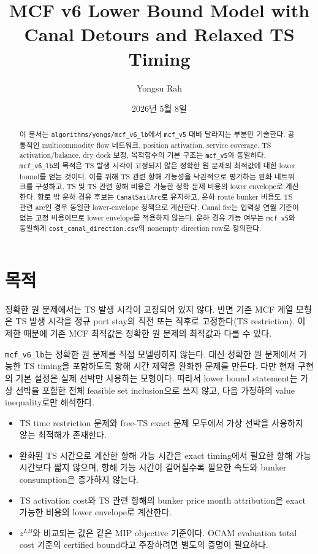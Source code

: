 \documentclass[11pt]{article}
\title{MCF v6 Lower Bound Model with Canal Detours and Relaxed TS Timing}
\author{Yongsu Rah}
\date{2026년 5월 8일}
\begin{document}
\maketitle

\begin{abstract}
이 문서는 \texttt{algorithms/yongs/mcf\_v6\_lb}에서 \texttt{mcf\_v5} 대비
달라지는 부분만 기술한다. 공통적인 multicommodity flow 네트워크, position
activation, service coverage, TS activation/balance, dry dock 보정, 목적함수의
기본 구조는 \texttt{mcf\_v5}와 동일하다. \texttt{mcf\_v6\_lb}의 목적은 TS 발생
시각이 고정되지 않은 정확한 원 문제의 최적값에 대한 lower bound를 얻는 것이다.
이를 위해 TS 관련 항해 가능성을 낙관적으로 평가하는 완화 네트워크를 구성하고,
TS 및 TS 관련 항해 비용은 가능한 정확 문제 비용의 lower envelope로 계산한다.
항로 밖 운하 경유 후보는 \texttt{CanalSailArc}로 유지하고, 운하 route bunker 비용도
TS 관련 arc인 경우 동일한 lower-envelope 정책으로 계산한다. Canal fee는 입력상
연월 기준이 없는 고정 비용이므로 lower envelope를 적용하지 않는다.
운하 경유 가능 여부는 \texttt{mcf\_v5}와 동일하게
\texttt{cost\_canal\_direction.csv}의 nonempty direction row로 정의한다.
\end{abstract}

\section{목적}

정확한 원 문제에서는 TS 발생 시각이 고정되어 있지 않다. 반면 기존 MCF 계열 모형은
TS 발생 시각을 정규 port stay의 직전 또는 직후로 고정한다(TS restriction). 이 제한 때문에
기존 MCF 최적값은 정확한 원 문제의 최적값과 다를 수 있다.

\texttt{mcf\_v6\_lb}는 정확한 원 문제를 직접 모델링하지 않는다. 대신 정확한 원
문제에서 가능한 TS timing을 포함하도록 항해 시간 제약을 완화한 문제를 만든다.
다만 현재 구현의 기본 설정은 실제 선박만 사용하는 모형이다. 따라서 lower bound
statement는 가상 선박을 포함한 전체 feasible set inclusion으로 쓰지 않고, 다음
가정하의 value inequality로만 해석한다.

\begin{itemize}
  \item TS time restriction 문제와 free-TS exact 문제 모두에서 가상 선박을 사용하지
  않는 최적해가 존재한다.
  \item 완화된 TS 시간으로 계산한 항해 가능 시간은 exact timing에서 필요한 항해
  가능 시간보다 짧지 않으며, 항해 가능 시간이 길어질수록 필요한 속도와 bunker
  consumption은 증가하지 않는다.
  \item TS activation cost와 TS 관련 항해의 bunker price month attribution은 exact
  가능한 비용의 lower envelope로 계산한다.
  \item $z^{LB}$와 비교되는 값은 같은 MIP objective 기준이다. OCAM
  evaluation total cost 기준의 certified bound라고 주장하려면 별도의 증명이 필요하다.
\end{itemize}
\end{document}
